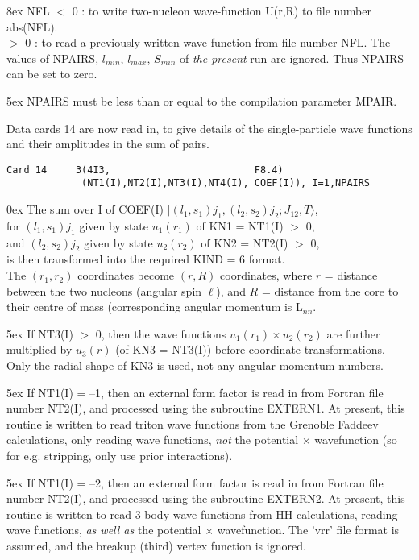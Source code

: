\documentclass[11pt]{article}
\begin{document}
\hangindent 8ex  NFL
      $<$ 0    : to write two-nucleon wave-function U(r,R) to file
number abs(NFL).
\\  $>$ 0 : to read a previously-written wave function from file number
NFL.  The values of NPAIRS, $l_{min}$, $l_{max}$, $S_{min}$ of
{\em the present}
run are ignored.  Thus NPAIRS can be set to zero.



\hangindent 5ex
NPAIRS must be less than or equal to the compilation parameter MPAIR.

\bigskip
Data cards 14 are now read in, to give details of the single-particle
wave functions and their amplitudes in the sum of pairs.
%

\begin{verbatim}
Card 14     3(4I3,                         F8.4)
             (NT1(I),NT2(I),NT3(I),NT4(I), COEF(I)), I=1,NPAIRS
\end{verbatim}

\hangindent 0ex
The sum over I of  COEF(I) $| (l_1,s_1)j_1, (l_2,s_2)j_2 ; J_{12},T \rangle$,
\\
   for  $(l_1,s_1)j_1$  given by state $u_1(r_1)$ of KN1 = NT1(I) $>$ 0,
\\
   and  $(l_2,s_2)j_2$  given by state $u_2(r_2)$ of KN2 = NT2(I) $>$ 0,
\\
is then transformed into the required KIND = 6 format.\\
The $(r_1,r_2)$ coordinates become $(r,R)$ coordinates,
where
$r$ = distance between the two nucleons (angular spin $\ell$), and
$R$ = distance from the core to their centre of mass
     (corresponding angular momentum is L$_{nn}$.

\hangindent 5ex
If NT3(I) $>$ 0, then the wave functions $u_1(r_1)\times u_2(r_2)$ are further
multiplied by $u_3(r)$ (of KN3 = NT3(I)) before coordinate transformations.
Only the radial shape of KN3 is used, not any angular momentum numbers.
\bigskip

\hangindent 5ex
If NT1(I) = --1, then an external form factor is read in from Fortran file
number NT2(I), and processed using the subroutine EXTERN1.
At present, this routine is written to read triton wave functions
from the Grenoble Faddeev calculations,
only reading wave functions, {\em not} the potential $\times$
wavefunction (so for e.g. stripping, only use prior interactions).

\hangindent 5ex
If NT1(I) = --2, then an external form factor is read in from Fortran file
number NT2(I), and processed using the subroutine EXTERN2.
At present, this routine is written to read 3-body wave functions
from HH calculations, reading wave functions, {\em as well as} the
potential $\times$ wavefunction. The 'vrr' file format is assumed,
and the breakup (third) vertex function  is ignored.
\bigskip
\end{document}
